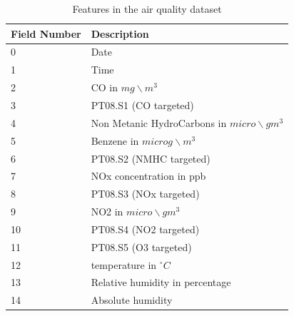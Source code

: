 \begin{table}[ht]
    \centering
    \begin{tabular}{| l | l | }
        \hline
        \textbf{Field Number} & \textbf{Description}                               \\
        \hline
        0                     & Date                                               \\[0.1cm]
        \hline
        1                     & Time                                               \\[0.1cm]
        \hline
        2                     & CO in $mg\backslash m^3$                           \\[0.1cm]
        \hline
        3                     & PT08.S1 (CO targeted)                              \\[0.1cm]
        \hline
        4                     & Non Metanic HydroCarbons in $micro\backslash gm^3$ \\[0.1cm]
        \hline
        5                     & Benzene in $microg\backslash m^3$                  \\[0.1cm]
        \hline
        6                     & PT08.S2 (NMHC targeted)                            \\[0.1cm]
        \hline
        7                     & NOx concentration in ppb                           \\[0.1cm]
        \hline
        8                     & PT08.S3 (NOx targeted)                             \\[0.1cm]
        \hline
        9                     & NO2 in $micro\backslash gm^3$                      \\[0.1cm]
        \hline
        10                    & PT08.S4 (NO2 targeted)                             \\[0.1cm]
        \hline
        11                    & PT08.S5 (O3 targeted)                              \\[0.1cm]
        \hline
        12                    & temperature in $^{\circ}C$                         \\[0.1cm]
        \hline
        13                    & Relative humidity in percentage                    \\[0.1cm]
        \hline
        14                    & Absolute humidity                                  \\[0.1cm]
        \hline
    \end{tabular}
    \vspace{0.3cm}
    \captionsetup{justification=centering}
    \caption{Features in the air quality dataset}
    \label{sec:hi_estimation:datasets:air_quality_table}
\end{table}


